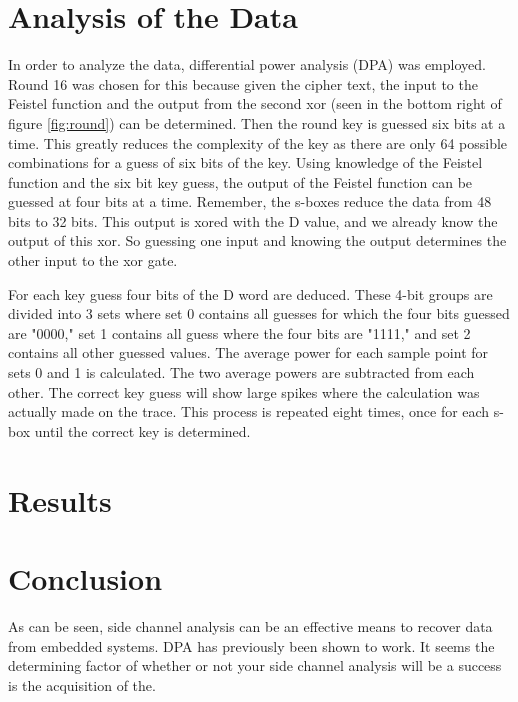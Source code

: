 \section{Analysis of the Data}\label{sec::analysis} 
	In order to analyze the data, differential power analysis (DPA) was employed.  Round 16 was chosen for this because given the cipher text, the input to the Feistel  function and the output from the second xor (seen in the bottom right of figure \ref{fig:round}) can be determined.  Then the round key is guessed six bits at a time.  This greatly reduces the complexity of the key as there are only 64 possible combinations for a guess of six bits of the key.  Using knowledge of the Feistel function and the six bit key guess, the output of the Feistel function can be guessed at four bits at a time.  Remember, the s-boxes reduce the data from 48 bits to 32 bits.  This output is xored with the D value, and we already know the output of this xor.  So guessing one input and knowing the output determines the other input to the xor gate.  
	
	For each key guess four bits of the D word are deduced.  These 4-bit groups are divided into 3 sets where set 0 contains all guesses for which the four bits guessed are "0000," set 1 contains all guess where the four bits are "1111," and set 2 contains all other guessed values.  The average power for each sample point for sets 0 and 1 is calculated.  The two average powers are subtracted from each other.  The correct key guess will show large spikes where the calculation was actually made on the trace.  This process is repeated eight times, once for each s-box until the correct key is determined.
	

\section{Results}\label{res}

\section{Conclusion}\label{sec::conclusion} 


	As can be seen, side channel analysis can be an effective means to recover data from embedded systems.  DPA has previously been shown to work.  It seems the determining factor of whether or not your side channel analysis will be a success is the acquisition of the.





